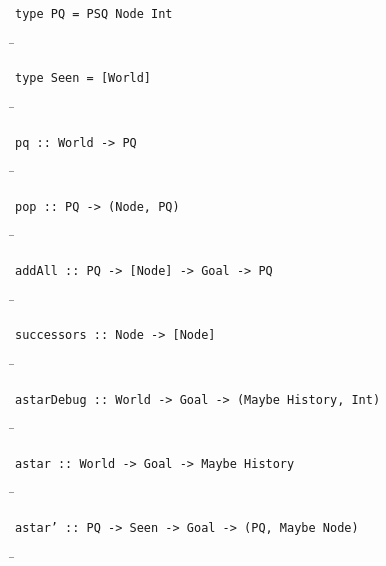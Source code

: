 \begin{verbatim}
type PQ = PSQ Node Int
\end{verbatim}
\begin{tabbing}
\hspace*{1cm}\= \kill
\> 
\end{tabbing}
\begin{verbatim}
type Seen = [World]
\end{verbatim}
\begin{tabbing}
\hspace*{1cm}\= \kill
\> 
\end{tabbing}
\begin{verbatim}
pq :: World -> PQ
\end{verbatim}
\begin{tabbing}
\hspace*{1cm}\= \kill
\> 
\end{tabbing}
\begin{verbatim}
pop :: PQ -> (Node, PQ)
\end{verbatim}
\begin{tabbing}
\hspace*{1cm}\= \kill
\> 
\end{tabbing}
\begin{verbatim}
addAll :: PQ -> [Node] -> Goal -> PQ
\end{verbatim}
\begin{tabbing}
\hspace*{1cm}\= \kill
\> 
\end{tabbing}
\begin{verbatim}
successors :: Node -> [Node]
\end{verbatim}
\begin{tabbing}
\hspace*{1cm}\= \kill
\> 
\end{tabbing}
\begin{verbatim}
astarDebug :: World -> Goal -> (Maybe History, Int)
\end{verbatim}
\begin{tabbing}
\hspace*{1cm}\= \kill
\> 
\end{tabbing}
\begin{verbatim}
astar :: World -> Goal -> Maybe History
\end{verbatim}
\begin{tabbing}
\hspace*{1cm}\= \kill
\> 
\end{tabbing}
\begin{verbatim}
astar’ :: PQ -> Seen -> Goal -> (PQ, Maybe Node)
\end{verbatim}
\begin{tabbing}
\hspace*{1cm}\= \kill
\> 
\end{tabbing}
